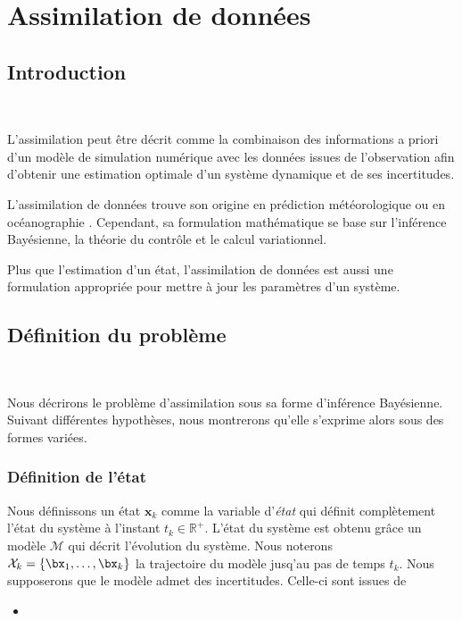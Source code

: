\section{Assimilation de données}

\subsection{Introduction}~\label{intro_da}

L'assimilation peut être décrit comme la combinaison des informations a priori d'un modèle de simulation numérique avec les données issues de l'observation afin d'obtenir une estimation optimale d'un système dynamique et de ses incertitudes.

L'assimilation de données trouve son origine en prédiction météorologique ou en océanographie . Cependant, sa formulation mathématique se base sur l'inférence Bayésienne, la théorie du contrôle et le calcul variationnel.

Plus que l'estimation d'un état, l'assimilation de données est aussi une formulation appropriée pour mettre à jour les paramètres d'un système.

\subsection{Définition du problème}~\label{estimation}

Nous décrirons le problème d'assimilation sous sa forme d'inférence Bayésienne. Suivant différentes hypothèses, nous montrerons qu'elle s'exprime alors sous des formes variées.

\subsubsection{Définition de l'état}
Nous définissons un état $\bm x_k$ comme la variable d'\textit{état} qui définit complètement l'état du système à l'instant $t_k \in \mathbb R^+$. L'état du système est obtenu grâce un modèle $\mathcal{M}$ qui décrit l'évolution du système.
Nous noterons $\mathcal X_k = \{\bx_1, \dots, \bx_k\}$ la trajectoire du modèle jusq'au pas de temps $t_k$.
Nous supposerons que le modèle admet des incertitudes. Celle-ci sont issues de

\begin{itemize}
    \item {}
\end{itemize}


